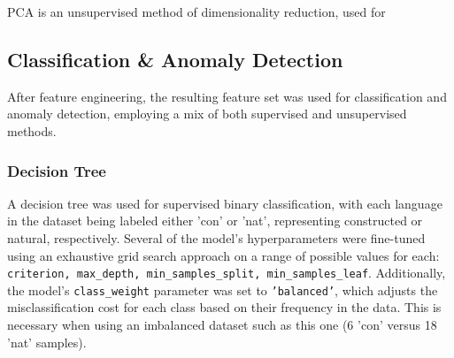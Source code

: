 \documentclass[12pt,a4paper]{article}
\numberwithin{figure}{section}
\numberwithin{table}{section}
\numberwithin{definition}{section}
\begin{document}
PCA is an unsupervised method of dimensionality reduction, used for  


\subsection{Classification \& Anomaly Detection}
\label{ssec:classificationandanomalydetection}



After feature engineering, the resulting feature set was used for classification and anomaly detection, employing a mix of both supervised and unsupervised methods. 

\subsubsection{Decision Tree}
\label{ssec:decisiontree}


A decision tree was used for supervised binary classification, with each language in the dataset being labeled either 'con' or 'nat', representing constructed or natural, respectively. Several of the model's hyperparameters were fine-tuned using an exhaustive grid search approach on a range of possible values for each: \texttt{criterion, max\_depth, min\_samples\_split, min\_samples\_leaf}. Additionally, the model's \texttt{class\_weight} parameter was set to \texttt{'balanced'}, which adjusts the misclassification cost for each class based on their frequency in the data. This is necessary when using an imbalanced dataset such as this one (6 'con' versus 18 'nat' samples).
\end{document}

